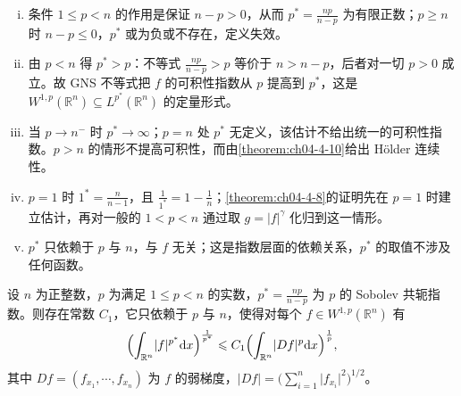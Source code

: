 \documentclass[../../main.tex]{subfiles}%
\begin{document}
\begin{remark}\label{remark:ch04-def-4-7-条件}
\begin{enumerate}[(i)]
\item 条件 $1\leqslant p<n$ 的作用是保证 $n-p>0$，从而 $p^*=\frac{np}{n-p}$ 为有限正数；$p\geqslant n$ 时 $n-p\leqslant0$，$p^*$ 或为负或不存在，定义失效。
\item 由 $p<n$ 得 $p^*>p$：不等式 $\frac{np}{n-p}>p$ 等价于 $n>n-p$，后者对一切 $p>0$ 成立。故 GNS 不等式把 $f$ 的可积性指数从 $p$ 提高到 $p^*$，这是 $W^{1,p}(\mathbb{R}^n)\subseteq L^{p^*}(\mathbb{R}^n)$ 的定量形式。
\item 当 $p\to n^{-}$ 时 $p^*\to\infty$；$p=n$ 处 $p^*$ 无定义，该估计不给出统一的可积性指数。$p>n$ 的情形不提高可积性，而由\cref{theorem:ch04-4-10}给出 Hölder 连续性。%
\item $p=1$ 时 $1^*=\frac{n}{n-1}$，且 $\frac{1}{1^*}=1-\frac{1}{n}$；\cref{theorem:ch04-4-8}的证明先在 $p=1$ 时建立估计，再对一般的 $1<p<n$ 通过取 $g=\lvert f\rvert^{\gamma}$ 化归到这一情形。%
\item $p^*$ 只依赖于 $p$ 与 $n$，与 $f$ 无关；这是指数层面的依赖关系，$p^*$ 的取值不涉及任何函数。
\end{enumerate}
\end{remark}

\begin{theorem}\label{theorem:ch04-4-8}
设 $n$ 为正整数，$p$ 为满足 $1\leqslant p<n$ 的实数，$p^*=\frac{np}{n-p}$ 为 $p$ 的 Sobolev 共轭指数。则存在常数 $C_1$，它只依赖于 $p$ 与 $n$，使得对每个 $f\in W^{1,p}(\mathbb{R}^n)$ 有
\begin{align*}
\Bigl(\int_{\mathbb{R}^n}\lvert f\rvert^{p^*}\mathrm{d} x\Bigr)^{\frac{1}{p^*}}\leqslant C_1\Bigl(\int_{\mathbb{R}^n}\lvert Df\rvert^p\mathrm{d} x\Bigr)^{\frac{1}{p}},
\end{align*}
其中 $Df=(f_{x_1},\cdots,f_{x_n})$ 为 $f$ 的弱梯度，$\lvert Df\rvert=\bigl(\sum_{i=1}^{n}\lvert f_{x_i}\rvert^{2}\bigr)^{1/2}$。
\end{theorem}
\end{document}
